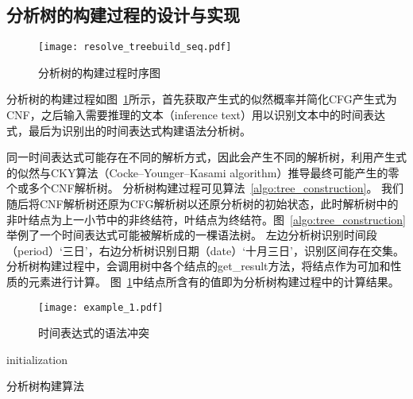 \subsection{分析树的构建过程的设计与实现}

\begin{figure}[h]
    \centering
    \texttt{[image: resolve\_treebuild\_seq.pdf]}
    \caption{分析树的构建过程时序图}
    \label{fig:tree_construction}
\end{figure}

分析树的构建过程如图~\ref{fig:tree_construction}所示，首先获取产生式的似然概率并简化CFG产生式为CNF，之后输入需要推理的文本（inference text）用以识别文本中的时间表达式，最后为识别出的时间表达式构建语法分析树。

同一时间表达式可能存在不同的解析方式，因此会产生不同的解析树，利用产生式的似然与CKY算法（Cocke–Younger–Kasami algorithm）推导最终可能产生的零个或多个CNF解析树。
分析树构建过程可见算法~\ref{algo:tree_construction}。
我们随后将CNF解析树还原为CFG解析树以还原分析树的初始状态，此时解析树中的非叶结点为上一小节中的非终结符，叶结点为终结符。图~\ref{algo:tree_construction}举例了一个时间表达式可能被解析成的一棵语法树。
左边分析树识别时间段（period）‘三日’，右边分析树识别日期（date）‘十月三日’，识别区间存在交集。分析树构建过程中，会调用树中各个结点的get\_result方法，将结点作为可加和性质的元素进行计算。
图~\ref{fig:tree_construction}中结点所含有的值即为分析树构建过程中的计算结果。

\begin{figure}[t]
    \centering
    \texttt{[image: example\_1.pdf]}
    \caption{时间表达式的语法冲突}
    \label{fig:example_1}
\end{figure}

\begin{algorithm}[htb]
    \SetAlgoLined
    initialization\;
     {
    }
    \caption{分析树构建算法}
    \label{algo:tree_construction}
\end{algorithm}

